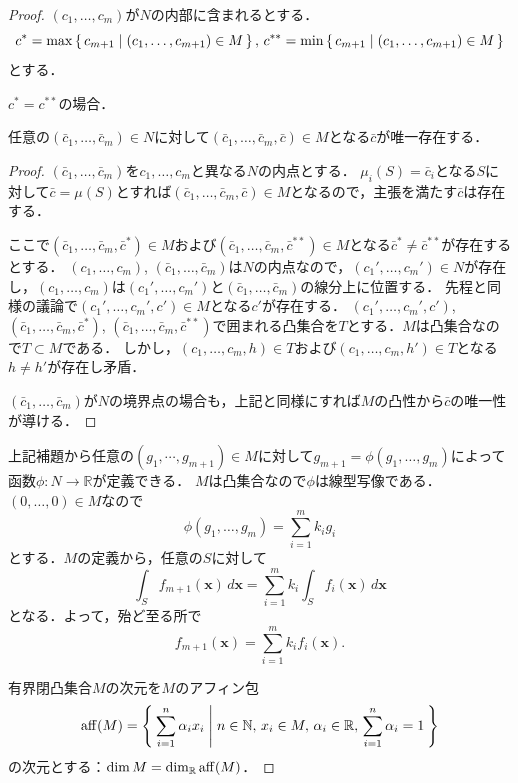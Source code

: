 \begin{proof}
  \((c_1, \ldots, c_m)\)が\(N\)の内部に含まれるとする．
  \[
  c^* = \max\set{ c_{m+1} | (c_1, \ldots, c_{m+1}) \in M} , \,
  c^{**} = \min\set{ c_{m+1} | (c_1, \ldots, c_{m+1}) \in M}
  \]
  とする．

  \(c^*=c^{**}\)の場合．
  \begin{lem}
    任意の\((\bar{c}_1, \ldots, \bar{c}_m) \in N\)に対して\((\bar{c}_1, \ldots, \bar{c}_m, \bar{c}) \in M\)となる\(\bar{c}\)が唯一存在する．
  \end{lem}
  \begin{proof}
    \((\bar{c}_1, \ldots, \bar{c}_m)\)を\(c_1, \ldots, c_m\)と異なる\(N\)の内点とする．
    \(\mu_i(S) = \bar{c}_i\)となる\(S\)に対して\(\bar{c}=\mu(S)\)とすれば\((\bar{c}_1, \ldots, \bar{c}_m, \bar{c}) \in M\)となるので，主張を満たす\(\bar{c}\)は存在する．

    ここで\((\bar{c}_1, \ldots, \bar{c}_m, \bar{c}^*) \in M\)および\((\bar{c}_1, \ldots, \bar{c}_m, \bar{c}^{**}) \in M\)となる\(\bar{c}^*\neq\bar{c}^{**}\)が存在するとする．
    \((c_1, \ldots, c_m)\), \((\bar{c}_1, \ldots, \bar{c}_m)\)は\(N\)の内点なので，\((c_1', \ldots, c_m') \in N\)が存在し，\((c_1, \ldots, c_m)\)は\((c_1', \ldots, c_m')\)と\((\bar{c}_1, \ldots, \bar{c}_m)\)の線分上に位置する．
    先程と同様の議論で\((c_1', \ldots, c_m', c') \in M\)となる\(c'\)が存在する．
    \((c_1', \ldots, c_m', c')\), \((\bar{c}_1, \ldots, \bar{c}_m, \bar{c}^*)\), \((\bar{c}_1, \ldots, \bar{c}_m, \bar{c}^{**})\)で囲まれる凸集合を\(T\)とする．\(M\)は凸集合なので\(T \subset M\)である．
    しかし，\((c_1, \ldots, c_m, h) \in T\)および\((c_1, \ldots, c_m, h') \in T\)となる\(h \neq h'\)が存在し矛盾．

    \((\bar{c}_1, \ldots, \bar{c}_m)\)が\(N\)の境界点の場合も，上記と同様にすれば\(M\)の凸性から\(\bar{c}\)の唯一性が導ける．
  \end{proof}

  上記補題から任意の\((g_1, \cdots, g_{m+1}) \in M\)に対して\(g_{m+1} = \phi(g_1, \ldots, g_m)\)によって函数\(\phi\colon N \to \mathbb{R}\)が定義できる．
  \(M\)は凸集合なので\(\phi\)は線型写像である．\((0, \ldots, 0) \in M\)なので
  \[ \phi(g_1, \ldots, g_m) = \sum_{i=1}^m k_i g_i \]
  とする．\(M\)の定義から，任意の\(S\)に対して
  \[ \int_S f_{m+1}(\boldsymbol{x}) \, d\boldsymbol{x} = \sum_{i=1}^m k_i \int_S f_i(\boldsymbol{x}) \, d\boldsymbol{x} \]
  となる．よって，殆ど至る所で
  \[ f_{m+1}(\boldsymbol{x}) = \sum_{i=1}^m k_i f_i(\boldsymbol{x}) . \]

  有界閉凸集合\(M\)の次元を\(M\)のアフィン包
  \[ \operatorname{aff}(M) = \Set{\sum_{i=1}^n \alpha_i x_i | n\in\mathbb{N}, \, x_i \in M , \, \alpha_i \in \mathbb{R} , \, \sum_{i=1}^n \alpha_i = 1 } \]
  の次元とする：\(\dim M = \dim_\mathbb{R} \operatorname{aff}(M)\)．


\end{proof}
